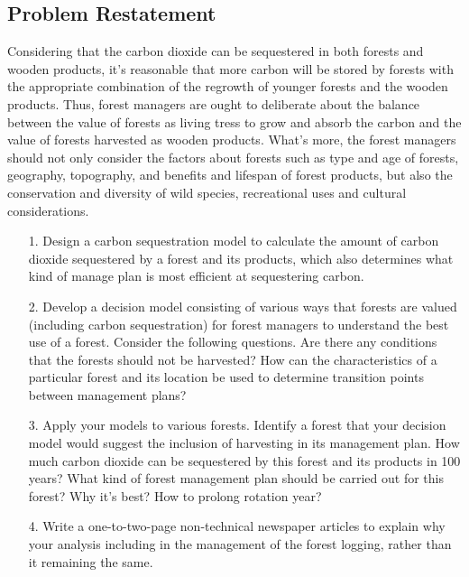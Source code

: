 \documentclass{mcmthesis}
\numberwithin{figure}{section}
\numberwithin{table}{section}
\numberwithin{equation}{section}
\begin{document}
\subsection{Problem Restatement}
Considering that the carbon dioxide can be sequestered in both forests 
and wooden products, it's reasonable that more carbon will be stored by forests with the 
appropriate combination of the regrowth of younger forests and the wooden products.
Thus, forest managers are ought to deliberate about the balance between the value of forests 
as living tress to grow and absorb the carbon and the value of forests harvested as wooden products.
What's more, the forest managers should not only consider the factors about forests such as 
type and age of forests, geography, topography, and benefits and lifespan of forest products,
but also the conservation and diversity of wild species, recreational uses and cultural considerations.
\begin{enumerate}
    \item [1.] Design a carbon sequestration model to calculate the amount of carbon dioxide 
    sequestered by a forest and its products, which also determines what kind of manage plan is
    most efficient at sequestering carbon.
    \item [2.] Develop a decision model consisting of various ways that forests are valued (including
    carbon sequestration) for forest managers to understand the best use of a forest. Consider 
    the following questions. 
    Are there any conditions that the forests should not be harvested?
    How can the characteristics of a particular forest and its location be used 
    to determine transition points between management plans?
    \item [3.] Apply your models to various forests. Identify a forest that your decision model 
    would suggest the inclusion of harvesting in its management plan.
    How much carbon dioxide can be sequestered by this forest and its products in 100 years?
    What kind of forest management plan should be carried out for this forest? Why it's best?
    How to prolong rotation year?

    \item [4.] Write a one-to-two-page non-technical newspaper articles to explain why your analysis including in the management of the forest logging, rather
    than it remaining the same.
\end{enumerate}
\end{document}
